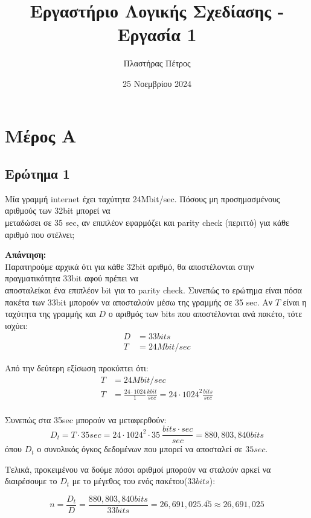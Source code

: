 \documentclass[]{article}
\begin{document}
\author{Πλαστήρας Πέτρος}
\title{Εργαστήριο Λογικής Σχεδίασης - Εργασία 1}
\date{25 Νοεμβρίου 2024}
\maketitle

\section{Μέρος Α}
\subsection{Ερώτημα 1}
Μία γραμμή internet έχει ταχύτητα 24Mbit/sec.
Πόσους μη προσημασμένους αριθμούς των 32bit μπορεί να \\ μεταδώσει σε 35 sec,
αν επιπλέον εφαρμόζει και parity check (περιττό) για κάθε αριθμό που στέλνει;

\textbf{Απάντηση: }\\
Παρατηρούμε αρχικά ότι για κάθε 32bit αριθμό, θα αποστέλονται στην πραγματικότητα 33bit αφού πρέπει να \\
αποσταλείκαι ένα επιπλέον bit για το parity check. Συνεπώς το ερώτημα είναι πόσα πακέτα των 33bit μπορούν να αποσταλούν μέσω της γραμμής σε 35 sec.
Αν $T$ είναι η ταχύτητα της γραμμής και $D$ ο αριθμός των bits που αποστέλονται ανά πακέτο, τότε ισχύει:
\begin{align*}
	D & = 33bits     \\
	T & = 24Mbit/sec
\end{align*}

Από την δεύτερη εξίσωση προκύπτει ότι:
\begin{align*}
	T & = 24Mbit/sec                                                                  \\
	T & = \frac{24 \cdot 1024}{1} \frac{kbit}{sec} = 24 \cdot 1024^2 \frac{bits}{sec} \\
\end{align*}

Συνεπώς στα 35sec μπορούν να μεταφερθούν:
$$
	D_t = T \cdot 35sec = 24 \cdot 1024^2 \cdot 35 \ \frac{bits \cdot sec}{sec} = 880,803,840 bits
$$
όπου $D_t$ ο συνολικός όγκος δεδομένων που μπορεί να αποσταλεί σε $35sec$.

Τελικά, προκειμένου να δούμε πόσοι αριθμοί μπορούν να σταλούν αρκεί να
διαιρέσουμε το $D_t$ με το μέγεθος του ενός πακέτου($33bits$):

$$
	n = \frac{D_t}{D} = \frac{880,803,840 bits}{33 bits} = 26,691,025.\bar{45} \approx 26,691,025
$$
\end{document}
